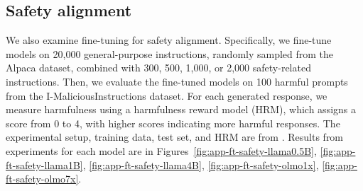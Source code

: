 \subsection{Safety alignment}
\label{app:ft-safety}

We also examine fine-tuning for safety alignment. Specifically, we fine-tune models on 20,000 general-purpose instructions, randomly sampled from the Alpaca dataset, combined with 300, 500, 1,000, or 2,000 safety-related instructions. Then, we evaluate the fine-tuned models on 100 harmful prompts from the I-MaliciousInstructions dataset. For each generated response, we measure harmfulness using a harmfulness reward model (HRM), which assigns a score from 0 to 4, with higher scores indicating more harmful responses. The experimental setup, training data, test set, and HRM are from \citet{bianchi2024safety}. Results from experiments for each model are in Figures~\ref{fig:app-ft-safety-llama0.5B}, \ref{fig:app-ft-safety-llama1B}, \ref{fig:app-ft-safety-llama4B}, \ref{fig:app-ft-safety-olmo1x}, \ref{fig:app-ft-safety-olmo7x}. 